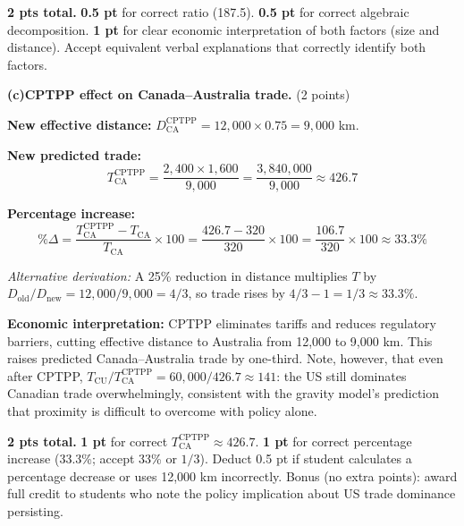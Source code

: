 \documentclass[11pt]{article}
\begin{document}
\begin{rubricbox}
\small
\textbf{2 pts total.} \textbf{0.5 pt} for correct ratio (187.5). \textbf{0.5 pt} for
correct algebraic decomposition. \textbf{1 pt} for clear economic interpretation of
both factors (size and distance). Accept equivalent verbal explanations that
correctly identify both factors.
\end{rubricbox}

\bigskip

\noindent\textbf{(c)}\quad\textbf{CPTPP effect on Canada--Australia trade.}
\quad(2 points)

\begin{solutionbox}
\textbf{New effective distance:} $D_{\text{CA}}^{\text{CPTPP}} = 12{,}000 \times 0.75 = 9{,}000$ km.

\textbf{New predicted trade:}
\[T_{\text{CA}}^{\text{CPTPP}}
  = \frac{2{,}400 \times 1{,}600}{9{,}000}
  = \frac{3{,}840{,}000}{9{,}000}
  \approx \mathbf{426.7}\]

\textbf{Percentage increase:}
\[\%\Delta = \frac{T_{\text{CA}}^{\text{CPTPP}} - T_{\text{CA}}}{T_{\text{CA}}}
  \times 100
  = \frac{426.7 - 320}{320}\times 100
  = \frac{106.7}{320}\times 100
  \approx \mathbf{33.3\%}\]

\textit{Alternative derivation:} A 25\% reduction in distance multiplies $T$ by
$D_{\text{old}}/D_{\text{new}} = 12{,}000/9{,}000 = 4/3$,
so trade rises by $4/3 - 1 = 1/3 \approx 33.3\%$.

\medskip
\noindent\textbf{Economic interpretation:} CPTPP eliminates tariffs and reduces
regulatory barriers, cutting effective distance to Australia from 12,000 to 9,000 km.
This raises predicted Canada--Australia trade by one-third. Note, however, that even
after CPTPP, $T_{\text{CU}}/T_{\text{CA}}^{\text{CPTPP}} = 60{,}000/426.7 \approx 141$:
the US still dominates Canadian trade overwhelmingly, consistent with the gravity
model's prediction that proximity is difficult to overcome with policy alone.
\end{solutionbox}

\begin{rubricbox}
\small
\textbf{2 pts total.} \textbf{1 pt} for correct $T_{\text{CA}}^{\text{CPTPP}} \approx 426.7$.
\textbf{1 pt} for correct percentage increase (33.3\%; accept 33\% or $1/3$). Deduct
0.5 pt if student calculates a percentage decrease or uses 12,000 km incorrectly.
Bonus (no extra points): award full credit to students who note the policy
implication about US trade dominance persisting.
\end{rubricbox}
\end{document}
